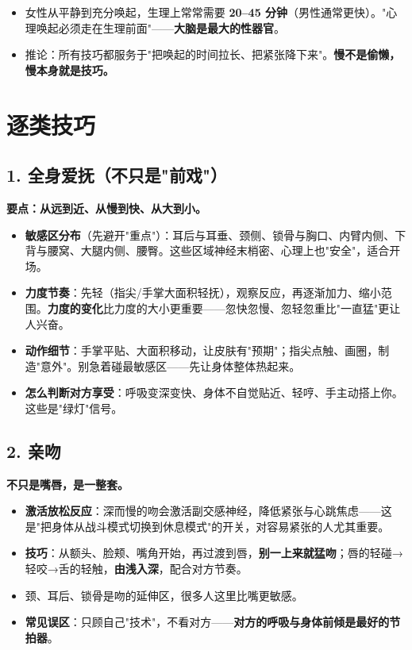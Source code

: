 \begin{itemize}[leftmargin=2em,itemsep=0.3em]
  \item 女性从平静到充分唤起，生理上常常需要 \textbf{20--45 分钟}（男性通常更快）。"心理唤起必须走在生理前面"——\textbf{大脑是最大的性器官}。
  \item 推论：所有技巧都服务于"把唤起的时间拉长、把紧张降下来"。\textbf{慢不是偷懒，慢本身就是技巧。}
\end{itemize}

\section{逐类技巧}

\subsection*{1. 全身爱抚（不只是"前戏"）}

\textbf{要点：从远到近、从慢到快、从大到小。}

\begin{itemize}[leftmargin=2em,itemsep=0.3em]
  \item \textbf{敏感区分布}（先避开"重点"）：耳后与耳垂、颈侧、锁骨与胸口、内臂内侧、下背与腰窝、大腿内侧、腰臀。这些区域神经末梢密、心理上也"安全"，适合开场。
  \item \textbf{力度节奏}：先轻（指尖/手掌大面积轻抚），观察反应，再逐渐加力、缩小范围。\textbf{力度的变化}比力度的大小更重要——忽快忽慢、忽轻忽重比"一直猛"更让人兴奋。
  \item \textbf{动作细节}：手掌平贴、大面积移动，让皮肤有"预期"；指尖点触、画圈，制造"意外"。别急着碰最敏感区——先让身体整体热起来。
  \item \textbf{怎么判断对方享受}：呼吸变深变快、身体不自觉贴近、轻哼、手主动搭上你。这些是"绿灯"信号。
\end{itemize}

\subsection*{2. 亲吻}

\textbf{不只是嘴唇，是一整套。}

\begin{itemize}[leftmargin=2em,itemsep=0.3em]
  \item \textbf{激活放松反应}：深而慢的吻会激活副交感神经，降低紧张与心跳焦虑——这是"把身体从战斗模式切换到休息模式"的开关，对容易紧张的人尤其重要。
  \item \textbf{技巧}：从额头、脸颊、嘴角开始，再过渡到唇，\textbf{别一上来就猛吻}；唇的轻碰→轻咬→舌的轻触，\textbf{由浅入深}，配合对方节奏。
  \item 颈、耳后、锁骨是吻的延伸区，很多人这里比嘴更敏感。
  \item \textbf{常见误区}：只顾自己"技术"，不看对方——\textbf{对方的呼吸与身体前倾是最好的节拍器}。
\end{itemize}

